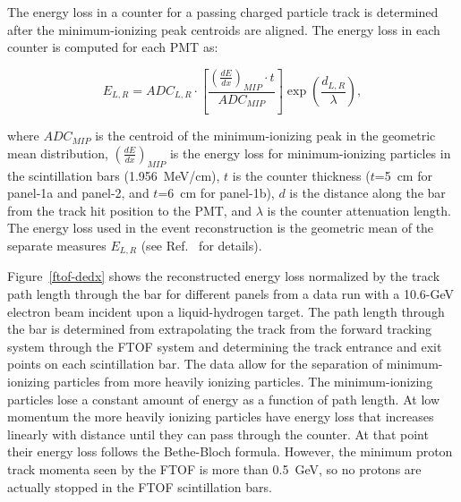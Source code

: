 \documentclass[3p,times,twocolumn]{elsarticle}
\begin{document}
The energy loss in a counter for a passing charged particle track is determined after the minimum-ionizing
peak centroids are aligned. The energy loss in each counter is computed for each PMT as:

\begin{equation}
E_{L,R} = ADC_{L,R} \cdot \left [ \frac{\left( \frac{dE}{dx} \right)_{MIP} \cdot t}{ADC_{MIP}}\right ]
\exp\left(\frac{d_{L,R}}{\lambda}\right),
\end{equation}

\noindent
where $ADC_{MIP}$ is the centroid of the minimum-ionizing peak in the geometric mean distribution,
$\left( \frac{dE}{dx} \right)_{MIP}$ is the energy loss for minimum-ionizing particles in the scintillation
bars (1.956~MeV/cm), $t$ is the counter thickness ($t$=5~cm for panel-1a and panel-2, and $t$=6~cm
for panel-1b), $d$ is the distance along the bar from the track hit position to the PMT, and $\lambda$ is
the counter attenuation length. The energy loss used in the event reconstruction is the geometric mean of
the separate measures $E_{L,R}$ (see Ref.~\cite{recon-nim} for details).

Figure~\ref{ftof-dedx} shows the reconstructed energy loss normalized by the track path length through
the bar for different panels from a data run with a 10.6-GeV electron beam incident upon a liquid-hydrogen
target. The path length through the bar is determined from extrapolating the track from the forward
tracking system through the FTOF system and determining the track entrance and exit points on each
scintillation bar. The data allow for the separation of minimum-ionizing particles from more heavily ionizing
particles. The minimum-ionizing particles lose a constant amount of energy as a function of path length. At
low momentum the more heavily ionizing particles have energy loss that increases linearly with distance until
they can pass through the counter. At that point their energy loss follows the Bethe-Bloch formula. However,
the minimum proton track momenta seen by the FTOF is more than 0.5~GeV, so no protons are actually stopped
in the FTOF scintillation bars.
\end{document}
